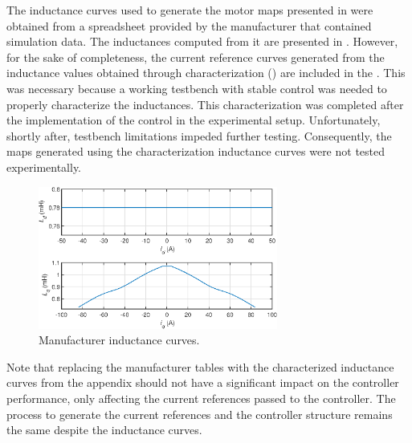 The inductance curves used to generate the motor maps presented in  were obtained from a spreadsheet provided by the manufacturer that contained simulation data. The inductances computed from it are presented in . However, for the sake of completeness, the current reference curves generated from the inductance values obtained through characterization () are included in the . This was necessary because a working testbench with stable control was needed to properly characterize the inductances. This characterization was completed after the implementation of the control in the experimental setup. Unfortunately, shortly after, testbench limitations impeded further testing. Consequently, the maps generated using the characterization inductance curves were not tested experimentally.

\begin{figure}[!htb]
	\centering
	\includegraphics[width=0.7\textwidth]{Figures/ldq_manufacturer.eps}
	\caption[Manufacturer inductance curves.]{Manufacturer inductance curves.}
	\label{fig:inductance_manufacturer} %
\end{figure}

Note that replacing the manufacturer tables with the characterized inductance curves from the appendix should not have a significant impact on the controller performance, only affecting the current references passed to the controller. The process to generate the current references and the controller structure remains the same despite the inductance curves.